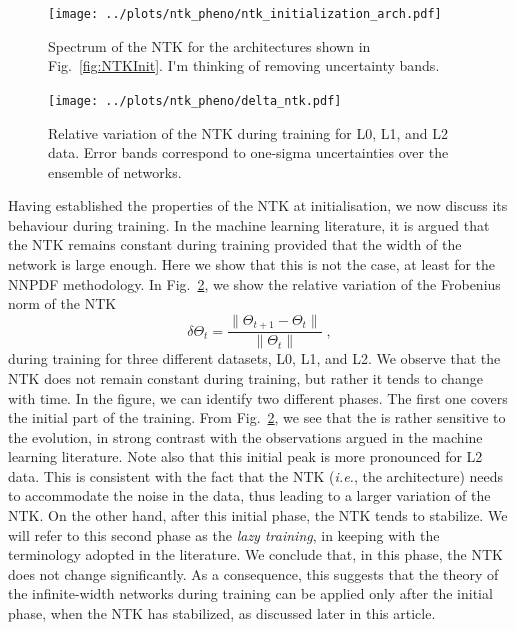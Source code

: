 \begin{figure}[ht!]
  \centering

  \texttt{[image: ../plots/ntk\_pheno/ntk\_initialization\_arch.pdf]}
  \caption{Spectrum of the NTK for the architectures shown in
  Fig.~\ref{fig:NTKInit}. \ac{I'm thinking of removing uncertainty bands.}}
  \label{fig:NTKSpectrum}
\end{figure}



\begin{figure}[ht!]
  \centering
  \texttt{[image: ../plots/ntk\_pheno/delta\_ntk.pdf]}
  \caption{Relative variation of the NTK during training for L0, L1, and L2
  data. Error bands correspond to one-sigma uncertainties over the ensemble of
  networks.}
  \label{fig:NTKTime}
\end{figure}
Having established the properties of the NTK at initialisation, we now discuss
its behaviour during training. In the machine learning literature, it is argued
that the NTK remains constant during training provided that the width of the
network is large enough. Here we show that this is not the case, at least for
the NNPDF methodology. In Fig.~\ref{fig:NTKTime}, we show the relative variation
of the Frobenius norm of the NTK
\begin{equation}
\delta \Theta_t = \frac{\lVert \Theta_{t+1} - \Theta_t \rVert}{\lVert \Theta_t \rVert} \;,
\label{eq:DeltaNTK}
\end{equation}
during training for three different datasets, L0, L1, and L2. We observe that
the NTK does not remain constant during training, but rather it tends to change
with time. In the figure, we can identify two different phases. The first one
covers the initial part of the training. From Fig.~\ref{fig:NTKTime}, we see
that the is rather sensitive to the evolution, in strong contrast with the
observations argued in the machine learning literature. Note also that this
initial peak is more pronounced for L2 data. This is consistent with the fact
that the NTK (\textit{i.e.}, the architecture) needs to accommodate the noise in
the data, thus leading to a larger variation of the NTK. On the other hand,
after this initial phase, the NTK tends to stabilize. We will refer to this
second phase as the \textit{lazy training}, in keeping with the terminology
adopted in the literature. We conclude that, in this phase, the NTK does not
change significantly. As a consequence, this suggests that the theory of the
infinite-width networks during training can be applied only after the initial
phase, when the NTK has stabilized, as discussed later in this article.

